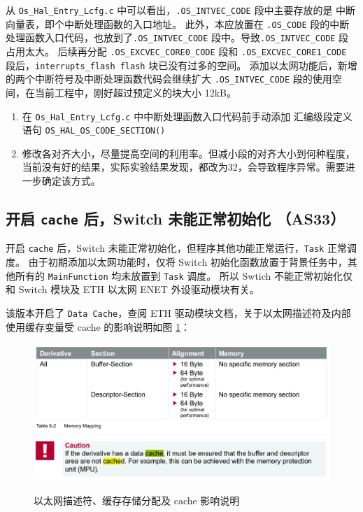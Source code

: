 从 \lstinline{Os_Hal_Entry_Lcfg.c} 中可以看出，\lstinline{.OS_INTVEC_CODE} 段中主要存放的是 中断向量表，即个中断处理函数的入口地址。
此外，本应放置在 \lstinline{.OS_CODE} 段的中断处理函数入口代码，也放到了\lstinline{.OS_INTVEC_CODE} 段中。导致\lstinline{.OS_INTVEC_CODE} 段占用太大。
后续再分配 \lstinline{.OS_EXCVEC_CORE0_CODE} 段和 \lstinline{.OS_EXCVEC_CORE1_CODE} 段后，\lstinline{interrupts_flash flash} 块已没有过多的空间。
添加以太网功能后，新增的两个中断符号及中断处理函数代码会继续扩大 \lstinline{.OS_INTVEC_CODE} 段的使用空间，在当前工程中，刚好超过预定义的块大小 12kB。

\begin{definition}[解决方案]
    \begin{enumerate}
        \item 在 \lstinline{Os_Hal_Entry_Lcfg.c} 中中断处理函数入口代码前手动添加 汇编级段定义语句 \lstinline{OS_HAL_OS_CODE_SECTION()}
        \item 修改各对齐大小，尽量提高空间的利用率。但减小段的对齐大小到何种程度，当前没有好的结果，实际实验结果发现，都改为32，会导致程序异常。需要进一步确定该方式。
    \end{enumerate}
\end{definition}

\subsection{开启 \lstinline{cache} 后，Switch 未能正常初始化 （AS33）}\label{subsec:desc_buffer_cache}

开启  \lstinline{cache} 后，Switch 未能正常初始化，但程序其他功能正常运行，\lstinline{Task} 正常调度。
由于初期添加以太网功能时，仅将 Switch 初始化函数放置于背景任务中，其他所有的 \lstinline{MainFunction} 均未放置到 \lstinline{Task} 调度。
所以 Swtich 不能正常初始化仅和 Switch 模块及 ETH 以太网 ENET 外设驱动模块有关。

该版本开启了 \lstinline{Data Cache}，查阅 ETH 驱动模块文档，关于以太网描述符及内部使用缓存变量受 cache 的影响说明如图 \ref{fig:desc_buffer_cache}：

\begin{figure}[htbp]
    \centering
    \includegraphics[scale=0.8]{pic/Snipaste_2021-11-05_13-10-08.png}
    \includegraphics[scale=0.8]{pic/Snipaste_2021-11-05_13-10-26.png}
    \caption{以太网描述符、缓存存储分配及 cache 影响说明}
    \label{fig:desc_buffer_cache}
\end{figure}

